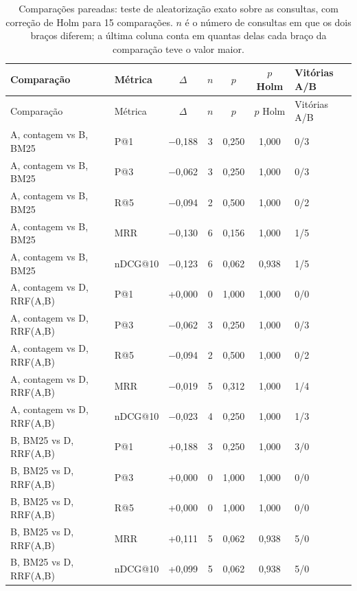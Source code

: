 {\footnotesize\setlength{\tabcolsep}{4pt}
\begin{longtable}{llccccl}
\caption{Comparações pareadas: teste de aleatorização exato sobre as consultas, com correção de Holm para 15 comparações. $n$ é o número de consultas em que os dois braços diferem; a última coluna conta em quantas delas cada braço da comparação teve o valor maior.}
\label{tab:retrieval-significance-section} \\
\toprule
Comparação & Métrica & $\Delta$ & $n$ & $p$ & $p$ Holm & Vitórias A/B \\
\midrule
\endfirsthead
\toprule
Comparação & Métrica & $\Delta$ & $n$ & $p$ & $p$ Holm & Vitórias A/B \\
\midrule
\endhead
A, contagem vs B, BM25 & P@1 & $-$0{,}188 & 3 & 0{,}250 & 1{,}000 & 0/3 \\
A, contagem vs B, BM25 & P@3 & $-$0{,}062 & 3 & 0{,}250 & 1{,}000 & 0/3 \\
A, contagem vs B, BM25 & R@5 & $-$0{,}094 & 2 & 0{,}500 & 1{,}000 & 0/2 \\
A, contagem vs B, BM25 & MRR & $-$0{,}130 & 6 & 0{,}156 & 1{,}000 & 1/5 \\
A, contagem vs B, BM25 & nDCG@10 & $-$0{,}123 & 6 & 0{,}062 & 0{,}938 & 1/5 \\
A, contagem vs D, RRF(A,B) & P@1 & +0{,}000 & 0 & 1{,}000 & 1{,}000 & 0/0 \\
A, contagem vs D, RRF(A,B) & P@3 & $-$0{,}062 & 3 & 0{,}250 & 1{,}000 & 0/3 \\
A, contagem vs D, RRF(A,B) & R@5 & $-$0{,}094 & 2 & 0{,}500 & 1{,}000 & 0/2 \\
A, contagem vs D, RRF(A,B) & MRR & $-$0{,}019 & 5 & 0{,}312 & 1{,}000 & 1/4 \\
A, contagem vs D, RRF(A,B) & nDCG@10 & $-$0{,}023 & 4 & 0{,}250 & 1{,}000 & 1/3 \\
B, BM25 vs D, RRF(A,B) & P@1 & +0{,}188 & 3 & 0{,}250 & 1{,}000 & 3/0 \\
B, BM25 vs D, RRF(A,B) & P@3 & +0{,}000 & 0 & 1{,}000 & 1{,}000 & 0/0 \\
B, BM25 vs D, RRF(A,B) & R@5 & +0{,}000 & 0 & 1{,}000 & 1{,}000 & 0/0 \\
B, BM25 vs D, RRF(A,B) & MRR & +0{,}111 & 5 & 0{,}062 & 0{,}938 & 5/0 \\
B, BM25 vs D, RRF(A,B) & nDCG@10 & +0{,}099 & 5 & 0{,}062 & 0{,}938 & 5/0 \\
\bottomrule
\end{longtable}
}
